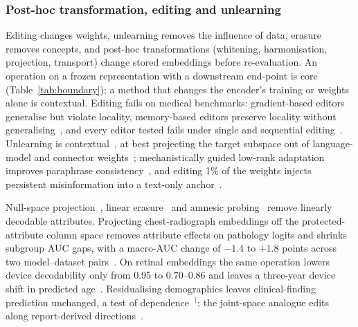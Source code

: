 \subsubsection{Post-hoc transformation, editing and unlearning}

Editing changes weights, unlearning removes the influence of data, erasure removes concepts, and
post-hoc transformations (whitening, harmonisation, projection, transport) change stored embeddings
before re-evaluation. An operation on a frozen representation with a downstream end-point is core
(Table~\ref{tab:boundary}); a method that changes the encoder's training or weights alone is contextual.
Editing fails on medical benchmarks: gradient-based editors generalise but violate locality,
memory-based editors preserve locality without generalising~\cite{zhu2026evaluating}, and every editor
tested fails under single and sequential editing~\cite{xu2025medmkeb,wen2025multimededit}. Unlearning
is contextual~\cite{guo2026exploring,hardan2025forgetmi,xu2025from}, at best projecting the target
subspace out of language-model and connector weights~\cite{wu2025hierarchy}; mechanistically guided
low-rank adaptation improves paraphrase consistency~\cite{sadanandan2026mechanistically}, and editing
1\% of the weights injects persistent misinformation into a text-only anchor~\cite{han2024medical}.

Null-space projection~\cite{ravfogel2020null,ravfogel2022linear}, linear erasure~\cite{belrose2023leace}
and amnesic probing~\cite{elazar2020amnesic} remove linearly decodable attributes. Projecting
chest-radiograph embeddings off the protected-attribute column space removes attribute effects on
pathology logits and shrinks subgroup AUC gaps, with a macro-AUC change of $-1.4$ to $+1.8$ points across
two model--dataset pairs~\cite{weber2023posthoc}. On retinal embeddings the same operation lowers
device decodability only from 0.95 to 0.70--0.86 and leaves a three-year device shift in predicted
age~\cite{li2026acquisition}. Residualising demographics leaves clinical-finding prediction unchanged,
a test of dependence~\cite{kim2026encoding}$^{\dagger}$; the joint-space analogue edits along
report-derived directions~\cite{sadashivaiah2024explaining}.


